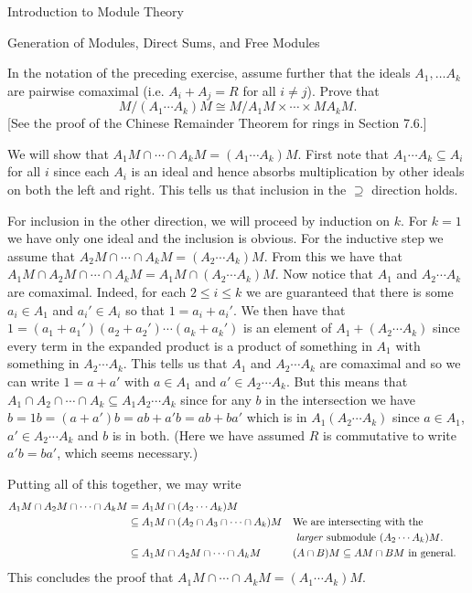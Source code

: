 \begin{chapter}{Introduction to Module Theory}
\begin{section}{Generation of Modules, Direct Sums, and Free Modules}
\begin{solution}
\end{solution}\oneperpage



\begin{problem}\label{ex:10.3.17}
In the notation of the preceding exercise, assume further that the ideals $A_1,\ldots A_k$ are pairwise comaximal (i.e. $A_i+A_j = R$ for all $i\neq j$). Prove that \[
M/(A_1\cdots A_k)M\cong M/A_1M\times \cdots\times MA_kM.
\]
[See the proof of the Chinese Remainder Theorem for rings in Section 7.6.]
\end{problem}
\begin{solution} \noindent We will show that $A_1M\cap \cdots \cap A_kM = (A_1\cdots A_k)M$.   First note that $A_1\cdots A_k\subseteq A_i$ for all $i$ since each $A_i$ is an ideal and hence absorbs multiplication by other ideals on both the left and right. This tells us that inclusion in the $\supseteq$ direction holds.

For inclusion in the other direction, we will proceed by induction on $k$. For $k=1$ we have only one ideal and the inclusion is obvious. For the inductive step we assume that $A_2M\cap \cdots \cap A_{k}M = (A_2\cdots A_k)M$. From this we have that $A_1M\cap A_2M\cap\cdots \cap A_kM = A_1M\cap (A_2\cdots A_k)M$. Now notice that $A_1$ and $A_2\cdots A_k$ are comaximal. Indeed, for each $2\le i \le k$ we are guaranteed that there is some $a_i\in A_1$ and $a_i'\in A_i$ so that $1=a_i+a_i'$. We then have that $1=(a_1+a_1')(a_2+a_2')\cdots(a_k+a_k')$ is an element of $A_1+(A_2\cdots A_k)$ since every term in the expanded product is a product of something in $A_1$ with something in $A_2\cdots A_k$. This tells us that $A_1$ and $A_2\cdots A_k$ are comaximal and so we can write $1 = a+a'$ with $a\in A_1$ and $a'\in A_2\cdots A_k$. But this means that $ A_1\cap A_2\cap\cdots \cap A_k \subseteq A_1A_2\cdots A_k $ since for any $b$ in the intersection we have $b = 1b = (a+a')b = ab+a'b = ab+ba'$ which is in $A_1(A_2\cdots A_k)$ since $a\in A_1$, $a'\in A_2\cdots A_k$ and $b$ is in both. (Here we have assumed $R$ is commutative to write $a'b = ba'$, which seems necessary.)

Putting all of this together, we may write \begin{align*}
A_1M\cap A_2M\cap\cdots \cap A_kM & =  A_1M\cap (A_2\cdots A_k)M\\
& \subseteq A_1M \cap (A_2\cap A_3\cap\cdots \cap A_k) M &&\text{We are intersecting with the}\\
&&&\text{ \emph{larger} submodule $(A_2\cdots A_k)M$.}\\
& \subseteq A_1M\cap A_2M\cap \cdots \cap A_kM&&\text{$(A\cap B)M\subseteq AM\cap BM$ in general.}
\end{align*}
This concludes the proof that $A_1M\cap \cdots \cap A_kM = (A_1\cdots A_k)M$.


\end{solution}
\end{section}
\end{chapter}
